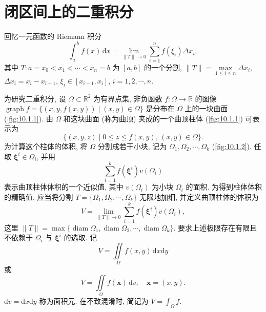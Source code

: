 
\section{闭区间上的二重积分}\label{sec:10.1}

回忆一元函数的 Riemann 积分
\[
  \int_{a}^{b} f(x)\,\mathrm{d}x = \lim_{\|T\| \to 0} \sum_{i=1}^{n} f(\xi_{i})\Delta x_{i},
\]
其中 $T\colon a = x_{0} < x_{1} < \cdots < x_{n} = b$ 为 $[a, b]$ 的一个分割, $\|T\| = \max\limits_{1 \leqslant i \leqslant n} \Delta x_{i}$, $\Delta x_{i} = x_{i} - x_{i-1}$, $\xi_{i} \in [x_{i-1}, x_{i}],\, i = 1, 2, \cdots, n$.

为研究二重积分, 设 $\Omega \subset \mathbb{R}^2$ 为有界点集, 非负函数 $f\colon \Omega \to \mathbb{R}$ 的图像 $\operatorname{graph} f = \{(x, y, f(x, y)) \mid (x, y) \in \Omega\}$ 是分布在 $\Omega$ 上的一块曲面 (\cref{fig:10.1.1}). 由 $\Omega$ 和这块曲面 (称为曲顶) 夹成的一个曲顶柱体 (\cref{fig:10.1.1}) 可表示为
\[
  \{(x, y, z) \mid 0 \leqslant z \leqslant f(x, y),\, (x, y) \in \Omega\}.
\]
为计算这个柱体的体积, 将 $\Omega$ 分割成若干小块, 记为 $\Omega_1, \Omega_2, \cdots, \Omega_k$ (\cref{fig:10.1.2}). 任取 $\boldsymbol{\xi}^i \in \Omega_i$, 并用
\[
  \sum_{i=1}^{k} f(\boldsymbol{\xi}^{i}) v(\Omega_{i})
\]
表示曲顶柱体体积的一个近似值, 其中 $v(\Omega_{i})$ 为小块 $\Omega_{i}$ 的面积. 为得到柱体体积的精确值, 应当将分割 $T = \{\Omega_{1}, \Omega_{2}, \cdots, \Omega_{k}\}$ 无限地加细, 并定义曲顶柱体的体积为
\[
  V = \lim_{\|T\| \to 0} \sum_{i=1}^{k} f(\boldsymbol{\xi}^{i}) v(\Omega_{i}),
\]
这里 $\|T\| = \max\{\operatorname{diam}\Omega_1, \operatorname{diam}\Omega_2, \cdots, \operatorname{diam}\Omega_k\}$. 要求上述极限存在有限且不依赖于 $\Omega_i$ 与 $\boldsymbol{\xi}^i$ 的选取. 记
\[
  V = \iint\limits_{\Omega} f(x, y)\,\mathrm{d}x\mathrm{d}y
\]
或
\[
  V = \iint\limits_{\Omega} f(\boldsymbol{x})\,\mathrm{d}v, \quad \boldsymbol{x} = (x, y).
\]
$\mathrm{d}v = \mathrm{d}x\mathrm{d}y$ 称为面积元. 在不致混淆时, 简记为 $V = \int_{\Omega} f$.

